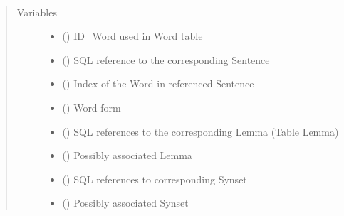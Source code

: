 \documentclass[letterpaper,10pt,english]{sphinxmanual}
\begin{document}
\begin{fulllineitems}
\label{\detokenize{classes:loacore.classes.classes.Word}}~\begin{quote}\begin{description}
\item[{Variables}] \leavevmode\begin{itemize}
\item {} 
 () \textendash{} ID\_Word used in Word table

\item {} 
 () \textendash{} SQL reference to the corresponding Sentence

\item {} 
 () \textendash{} Index of the Word in referenced Sentence

\item {} 
 () \textendash{} Word form

\item {} 
 () \textendash{} SQL references to the corresponding Lemma (Table Lemma)

\item {} 
 () \textendash{} Possibly associated Lemma

\item {} 
 () \textendash{} SQL references to corresponding Synset

\item {} 
 ({\hyperref[\detokenize{classes:loacore.classes.classes.Synset}]{}}) \textendash{} Possibly associated Synset


\end{itemize}
\end{description}
\end{quote}
\end{fulllineitems}
\end{document}
